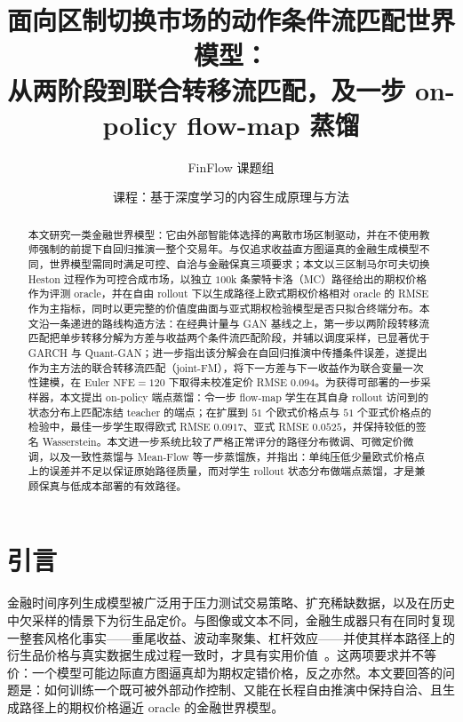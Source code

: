 \documentclass[11pt]{ctexart}
\title{\bfseries 面向区制切换市场的动作条件流匹配世界模型：\\
从两阶段到联合转移流匹配，及一步 on-policy flow-map 蒸馏}
\author{FinFlow 课题组}
\date{课程：基于深度学习的内容生成原理与方法}
\newcommand{\nfe}{\mathrm{NFE}}
\begin{document}
\maketitle

\begin{abstract}
本文研究一类金融世界模型：它由外部智能体选择的离散市场区制驱动，并在不使用教师强制的前提下自回归推演一整个交易年。与仅追求收益直方图逼真的金融生成模型不同，世界模型需同时满足可控、自洽与金融保真三项要求；本文以三区制马尔可夫切换 Heston 过程作为可控合成市场，以独立 $100$k 条蒙特卡洛（MC）路径给出的期权价格作为评测 oracle，并在自由 rollout 下以生成路径上欧式期权价格相对 oracle 的 RMSE 作为主指标，同时以更完整的价值度曲面与亚式期权检验模型是否只拟合终端分布。本文沿一条递进的路线构造方法：在经典计量与 GAN 基线之上，第一步以两阶段转移流匹配把单步转移分解为方差与收益两个条件流匹配阶段，并辅以调度采样，已显著优于 GARCH 与 Quant-GAN；进一步指出该分解会在自回归推演中传播条件误差，遂提出作为主方法的联合转移流匹配（joint-FM），将下一方差与下一收益作为联合变量一次性建模，在 Euler $\nfe{=}120$ 下取得未校准定价 RMSE $0.094$。为获得可部署的一步采样器，本文提出 on-policy 端点蒸馏：令一步 flow-map 学生在其自身 rollout 访问到的状态分布上匹配冻结 teacher 的端点；在扩展到 $51$ 个欧式价格点与 $51$ 个亚式价格点的检验中，最佳一步学生取得欧式 RMSE $0.0917$、亚式 RMSE $0.0525$，并保持较低的签名 Wasserstein。本文进一步系统比较了严格正常评分的路径分布微调、可微定价微调，以及一致性蒸馏与 Mean-Flow 等一步蒸馏族，并指出：单纯压低少量欧式价格点上的误差并不足以保证原始路径质量，而对学生 rollout 状态分布做端点蒸馏，才是兼顾保真与低成本部署的有效路径。
\end{abstract}

\section{引言}
\label{sec:intro}

金融时间序列生成模型被广泛用于压力测试交易策略、扩充稀缺数据，以及在历史中欠采样的情景下为衍生品定价。与图像或文本不同，金融生成器只有在同时复现一整套风格化事实——重尾收益、波动率聚集、杠杆效应——并使其样本路径上的衍生品价格与真实数据生成过程一致时，才具有实用价值~\citep{cont2001empirical}。这两项要求并不等价：一个模型可能边际直方图逼真却为期权定错价格，反之亦然。本文要回答的问题是：如何训练一个既可被外部动作控制、又能在长程自由推演中保持自洽、且生成路径上的期权价格逼近 oracle 的金融世界模型。
\end{document}
